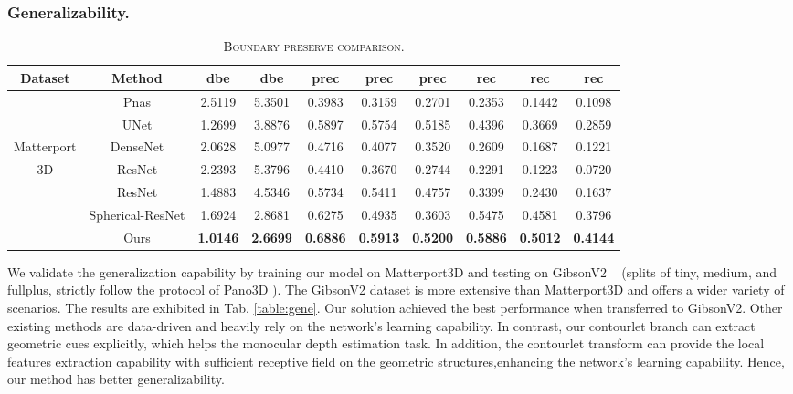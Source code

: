 \documentclass[10pt,times,mathptm,psfig,twocolumn,journals]{IEEEtran}
\begin{document}
\subsubsection{Generalizability.}
\begin{table*}[t]
\begin{center}
\caption{\textsc{Boundary preserve comparison.}}
\label{table:bp}
\begin{tabular}{cccccccccc}
\hline\noalign{\smallskip}
Dataset&Method & dbe & dbe & prec & prec & prec & rec & rec & rec\\
\hline\noalign{\smallskip}
\hline
&Pnas\cite{albanis2021pano3d}       & 2.5119  & 5.3501 & 0.3983 & 0.3159 & 0.2701 &0.2353 &0.1442 &0.1098     \\
&UNet\cite{albanis2021pano3d} & 1.2699  & 3.8876 & 0.5897 & 0.5754 & 0.5185 &0.4396 &0.3669 &0.2859      \\
Matterport&DenseNet\cite{albanis2021pano3d}    & 2.0628  & 5.0977 & 0.4716 & 0.4077 & 0.3520 &0.2609 &0.1687 &0.1221     \\
3D&ResNet\cite{albanis2021pano3d}    & 2.2393  & 5.3796 & 0.4410 & 0.3670 & 0.2744 &0.2291 &0.1223 &0.0720    \\
&ResNet\cite{albanis2021pano3d} & 1.4883  & 4.5346 & 0.5734 & 0.5411 & 0.4757 &0.3399 &0.2430 &0.1637\\
&Spherical-ResNet & 1.6924  & 2.8681 & 0.6275 & 0.4935 & 0.3603 &0.5475 &0.4581 &0.3796\\
&Ours   & \textbf{1.0146} & \textbf{2.6699}  & \textbf{0.6886} & \textbf{0.5913} & \textbf{0.5200} & \textbf{0.5886} & \textbf{0.5012} & \textbf{0.4144}    \\
\hline
\end{tabular}
\end{center}
\end{table*} 
We validate the generalization capability by training our model on Matterport3D and testing on GibsonV2 ~\cite{Xia_2018_CVPR} (splits of tiny, medium, and fullplus, strictly follow the protocol of Pano3D \cite{albanis2021pano3d}). The GibsonV2 dataset is more extensive than Matterport3D and offers a wider variety of scenarios. The results are exhibited in Tab. \ref{table:gene}. Our solution achieved the best performance when transferred to GibsonV2. Other existing methods are data-driven and heavily rely on the network’s learning capability. In contrast, our contourlet branch can extract geometric cues explicitly, which helps the monocular depth estimation task. In addition, the contourlet transform can provide the local  features extraction capability with sufficient receptive field on the geometric structures,enhancing the network’s learning capability. Hence, our method has better generalizability.
 
\end{document}
